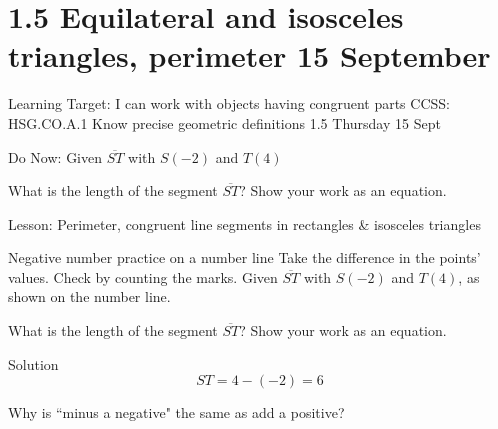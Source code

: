 \section{1.5 Equilateral and isosceles triangles, perimeter \hfill 15 September}
\begin{frame}{Learning Target: I can work with objects having congruent parts}
  {CCSS: HSG.CO.A.1 Know precise geometric definitions  \hfill \alert{1.5 Thursday 15 Sept}}
    \begin{block}{Do Now: Given $\overline{ST}$ with $S(-2)$ and $T(4)$}
      \begin{center}
      \end{center}
    What is the length of the segment $\overline{ST}$? Show your work as an equation.
    \end{block} \vspace{2cm}
    Lesson: Perimeter, congruent line segments in rectangles \& isosceles triangles
  \end{frame}

\begin{frame}{Negative number practice on a number line}
  {Take the difference in the points' values. Check by counting the marks.}
  Given $\overline{ST}$ with $S(-2)$ and $T(4)$, as shown on the number line.
  \begin{center}
  \end{center}
  What is the length of the segment $\overline{ST}$? Show your work as an equation. \par \bigskip
  \qquad Solution 
  $$ST=4-(-2)=6$$
  \par \vspace{2cm}
  Why is ``minus a negative" the same as add a positive? 
  \end{frame}

